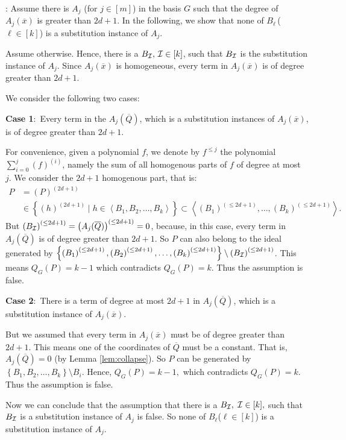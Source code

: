 \documentclass[12pt,reqno]{article}
\renewcommand{\l}{\ell}
\newcommand{\case}[1]{\ind\textbf{Case #1}:\,}
\newcommand {\ind} {\noindent}
\newenvironment{proof}{\QuadSpace\par\noindent{\bf Proof}:}{\EndProof\HalfSpace}
\newcommand{\QuadSpace}{\vspace{0.25\baselineskip}}
\newcommand{\HalfSpace}{\vspace{0.5\baselineskip}}
\newcommand{\EndProof}{ \hfill \vrule width 1ex height 1ex depth 0pt }
\newcommand{\set}[1]{\left\{#1\right\}}
\renewcommand{\t}[1]{\overline{#1}}
\newcommand{\degr}[2]{\left(#1\right)^{(#2)}}
\newcommand{\ideal}[1]{\ensuremath{\left\langle #1\right\rangle}}
\newcommand\ii{{\cal I}}
\begin{document}
\begin{proof}
Assume there is $A_j$ (for $j\in[m]$) in the basis $G$ such that  the degree of $A_j(\overline x)$ is greater than $2d+1$.
In the following, we show that none of  $B_\l$\,($\l\in[k]$) is  a substitution instance of $A_j$.

Assume otherwise. Hence, there is a $B_\ii,\,\ii\in[k]$, such that $B_\ii$  is the substitution instance of $A_j$.
Since $A_j(\overline x)$ is homogeneous, every term in $A_j(\overline x)$ is of degree greater than $2d+1$.

We consider  the following two cases:
\medskip

\case 1 Every term in the  $A_j(\overline Q)$, which is a  substitution instances of $A_j(\t x)$, is  of degree greater than $2d+1$.

For convenience, given a polynomial $f$, we denote by $f^{\leq j}$ the polynomial    $\sum_{i=0}^{j}\degr{f}{i}$, namely the sum of all homogenous parts of $f$ of degree at most  $j.$ We consider the $2d+1$ homogenous part, that is:
\begin{align*}
  P&=\degr{P}{2d+1}\\
  &\in \set{\degr{h}{2d+1}\;\big|\; h\in\ideal{B_1,B_2,\ldots,B_k}}\subset \ideal{\degr{B_1}{\leq 2d+1},\ldots,\degr{B_k}{ \leq 2d+1}} .
\end{align*}
But $\degr{B_\ii}{\leq 2d+1}=\degr{A_j(\overline Q)}{\leq 2d+1}=0$, because, in this case, every term in $A_j(\overline Q)$ is of degree greater than $2d+1$. So $P$ can also belong to the ideal generated by $\set{\degr{B_1}{\leq 2d+1},\degr{B_2}{\leq 2d+1},\ldots,
\degr{B_k}{\leq 2d+1}}\setminus\degr{B_\ii}{\leq 2d+1}$.
This  means $Q_{G}(P)=k-1$ which contradicts  $Q_G(P)=k$. Thus  the assumption is false.\medskip

\case 2 There is a term of degree at most  $2d+1$ in $A_j(\overline Q)$, which is a  substitution instance of $A_j(\t x)$.

But we assumed that every term in $A_j(\t x)$ must be of degree greater than $2d+1$.  This means one of the  coordinates  of $\overline Q$ must be a constant.
That is, $A_j(\overline Q)=0$ (by Lemma \ref{lem:collapse}).
So $P$ can be generated by $\set{B_1,B_2,\ldots,B_k}\setminus B_i$. Hence, $Q_{G}(P)=k-1,$ which contradicts  $Q_G(P)=k$. Thus  the assumption is false.

\medskip

Now we can conclude that the assumption that there is a $B_\ii,\; \ii \in[k],$ such that $B_\ii$ is a substitution instance of $A_j$ is false.
So none of $B_\l$\;($\l\in[k]$) is  a substitution instance of $A_j$.
\end{proof}
\end{document}
